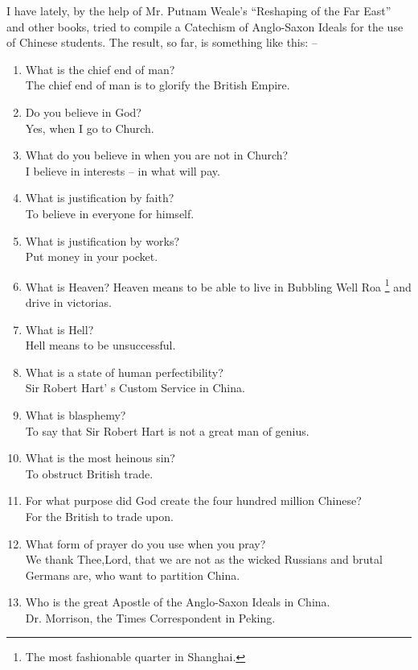 I have lately, by the help of Mr. Putnam Weale's ``Reshaping of the Far East'' and other books,
tried to compile a Catechism of Anglo-Saxon Ideals for the use of Chinese students.
The result, so far, is something like this: --
\begin{enumerate}
  \item What is the chief end of man? \\
    The chief end of man is to glorify the British Empire.
  \item Do you believe in God? \\
    Yes, when I go to Church.
  \item What do you believe in when you are not in Church? \\
    I believe in interests -- in what will pay.
  \item What is justification by faith? \\
    To believe in everyone for himself.
  \item What is justification by works? \\
     Put money in your pocket.
  \item What is Heaven?
    Heaven means to be able to live in Bubbling Well Roa
    \footnote{The most fashionable quarter in Shanghai.}
    and drive in victorias.
  \item What is Hell? \\
    Hell means to be unsuccessful.
  \item What is a state of human perfectibility? \\
    Sir Robert Hart' s Custom Service in China.
  \item What is blasphemy? \\
    To say that Sir Robert Hart is not a great man of genius.
  \item What is the most heinous sin? \\
    To obstruct British trade.
  \item For what purpose did God create the four hundred million Chinese? \\
    For the British to trade upon.
  \item What form of prayer do you use when you pray? \\
    We thank Thee,Lord, that we are not as the wicked Russians and brutal Germans are,
    who want to partition China.
  \item Who is the great Apostle of the Anglo-Saxon Ideals in China. \\
    Dr. Morrison, the Times Correspondent in Peking.
\end{enumerate}


